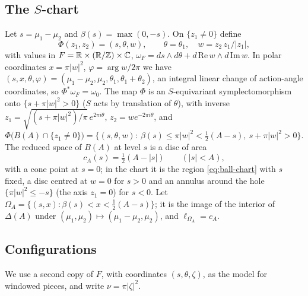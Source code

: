 \documentclass[11pt]{amsart}
\begin{document}
\subsection{The \texorpdfstring{$S$}{S}-chart}
Let $s=\mu_1-\mu_2$ and $\beta(s)=\max(0,-s)$. On $\{z_1\ne0\}$ define
\[
\Phi(z_1,z_2)=(s,\theta,w),\qquad \theta=\theta_1,\quad w=z_2\,z_1/|z_1|,
\]
with values in $F=\mathbb{R}\times(\mathbb{R}/\mathbb{Z})\times\mathbb{C}$, $\omega_F=ds\wedge d\theta+d\,\mathrm{Re}\,w\wedge d\,\mathrm{Im}\,w$.
In polar coordinates $x=\pi|w|^2$, $\varphi=\arg w/2\pi$ we have $(s,x,\theta,\varphi)=(\mu_1-\mu_2,\mu_2,\theta_1,
\theta_1+\theta_2)$, an integral linear change of action-angle coordinates, so $\Phi^*\omega_F=\omega_0$. The map
$\Phi$ is an $S$-equivariant symplectomorphism onto $\{s+\pi|w|^2>0\}$ ($S$ acts by translation of $\theta$), with
inverse $z_1=\sqrt{(s+\pi|w|^2)/\pi}\,e^{2\pi i\theta}$, $z_2=we^{-2\pi i\theta}$, and
\begin{equation}\label{eq:ball-chart}
\Phi\bigl(B(A)\cap\{z_1\ne0\}\bigr)=\bigl\{(s,\theta,w):\ \beta(s)\le\pi|w|^2<\tfrac12(A-s),\ s+\pi|w|^2>0\bigr\}.
\end{equation}
The reduced space of $B(A)$ at level $s$ is a disc of area
\[
c_A(s)=\tfrac12(A-|s|)\qquad(|s|<A),
\]
with a cone point at $s=0$; in the chart it is the region \eqref{eq:ball-chart} with $s$ fixed, a disc centred at
$w=0$ for $s>0$ and an annulus around the hole $\{\pi|w|^2\le -s\}$ (the axis $z_1=0$) for $s<0$. Let
$\Omega_A=\{(s,x):\beta(s)<x<\frac12(A-s)\}$; it is the image of the interior of $\Delta(A)$ under
$(\mu_1,\mu_2)\mapsto(\mu_1-\mu_2,\mu_2)$, and $\ell_{\Omega_A}=c_A$.

\subsection{Configurations}
We use a second copy of $F$, with coordinates $(s,\theta,\zeta)$, as the model for windowed pieces, and write
$\nu=\pi|\zeta|^2$.
\end{document}
